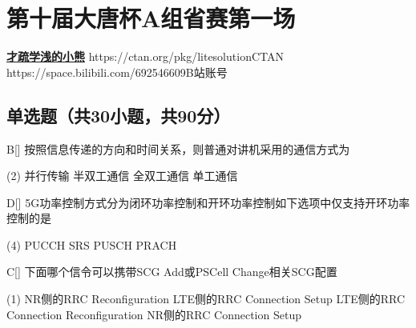 \chapter{第十届大唐杯A组省赛第一场}
\fancyhead[R]{\color{H6}\kaishu\rightmark\,}

\date{2023年4月08日}{}{\href{https://qm.qq.com/q/UPbGudx8cK}{\textbf{才疏学浅的小熊}}}
{}
{https://ctan.org/pkg/litesolution}{CTAN}
{https://space.bilibili.com/692546609}{B站账号}





\section{单选题（共30小题，共90分）}



\begin{choice}{B}[]
    按照信息传递的方向和时间关系，则普通对讲机采用的通信方式为
    \begin{tasks}(2)
        \task 并行传输
        \task 半双工通信
        \task 全双工通信
        \task 单工通信
    \end{tasks}
\end{choice}




\begin{choice}{D}[]
    5G功率控制方式分为闭环功率控制和开环功率控制如下选项中仅支持开环功率控制的是
    \begin{tasks}(4)
        \task PUCCH
        \task SRS
        \task PUSCH
        \task PRACH
    \end{tasks}
\end{choice}



\begin{choice}{C}[]
    下面哪个信令可以携带SCG Add或PSCell Change相关SCG配置
    \begin{tasks}(1)
        \task NR侧的RRC Reconfiguration
        \task LTE侧的RRC Connection Setup
        \task LTE侧的RRC Connection Reconfiguration
        \task NR侧的RRC Connection Setup
    \end{tasks}
\end{choice}


